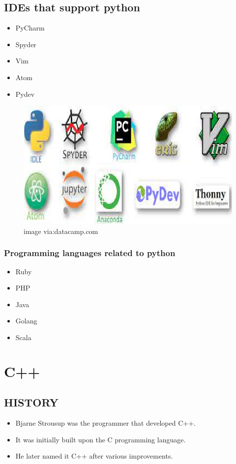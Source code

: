 \documentclass[12pt]{article}
\begin{document}
\newpage

\subsection{IDEs that support python}
           \begin{itemize}
           	\item PyCharm
           	\item Spyder
           	\item Vim
           	\item Atom
           	\item Pydev
           \end{itemize}
       
\begin{figure}[h]
	\includegraphics[width=0.7\linewidth]{screenshot006}
	\caption{image via:datacamp.com}
	\label{fig:screenshot006}
\end{figure}

\newpage

\subsubsection{Programming languages related to python}
              \begin{itemize}
              	\item Ruby
              	\item PHP
              	\item Java
              	\item Golang
              	\item Scala
              \end{itemize}
          
\newpage

\section{C++}

\subsection{HISTORY}
           \begin{itemize}
           	\item Bjarne Strousup was the programmer that developed C++.
           	\item It was initially built upon the C programming language. 
           	\item He later named it C++ after various improvements.
           \end{itemize} 
\end{document}
